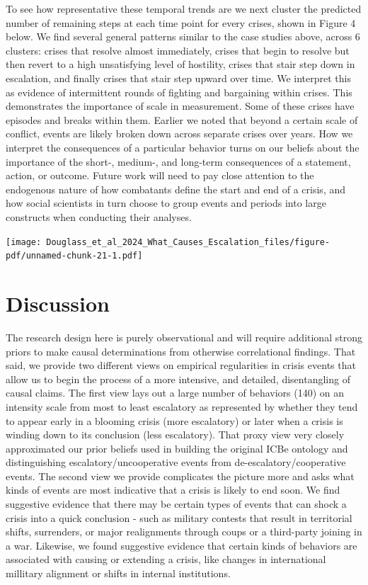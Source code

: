 \documentclass[
]{article}
\begin{document}
To see how representative these temporal trends are we next cluster the
predicted number of remaining steps at each time point for every crises,
shown in Figure 4 below. We find several general patterns similar to the
case studies above, across 6 clusters: crises that resolve almost
immediately, crises that begin to resolve but then revert to a high
unsatisfying level of hostility, crises that stair step down in
escalation, and finally crises that stair step upward over time. We
interpret this as evidence of intermittent rounds of fighting and
bargaining within crises. This demonstrates the importance of scale in
measurement. Some of these crises have episodes and breaks within them.
Earlier we noted that beyond a certain scale of conflict, events are
likely broken down across separate crises over years. How we interpret
the consequences of a particular behavior turns on our beliefs about the
importance of the short-, medium-, and long-term consequences of a
statement, action, or outcome. Future work will need to pay close
attention to the endogenous nature of how combatants define the start
and end of a crisis, and how social scientists in turn choose to group
events and periods into large constructs when conducting their analyses.

\texttt{[image: Douglass\_et\_al\_2024\_What\_Causes\_Escalation\_files/figure-pdf/unnamed-chunk-21-1.pdf]}

\section{Discussion}\label{discussion}

The research design here is purely observational and will require
additional strong priors to make causal determinations from otherwise
correlational findings. That said, we provide two different views on
empirical regularities in crisis events that allow us to begin the
process of a more intensive, and detailed, disentangling of causal
claims. The first view lays out a large number of behaviors (140) on an
intensity scale from most to least escalatory as represented by whether
they tend to appear early in a blooming crisis (more escalatory) or
later when a crisis is winding down to its conclusion (less escalatory).
That proxy view very closely approximated our prior beliefs used in
building the original ICBe ontology and distinguishing
escalatory/uncooperative events from de-escalatory/cooperative events.
The second view we provide complicates the picture more and asks what
kinds of events are most indicative that a crisis is likely to end soon.
We find suggestive evidence that there may be certain types of events
that can shock a crisis into a quick conclusion - such as military
contests that result in territorial shifts, surrenders, or major
realignments through coups or a third-party joining in a war. Likewise,
we found suggestive evidence that certain kinds of behaviors are
associated with causing or extending a crisis, like changes in
international millitary alignment or shifts in internal institutions.
\end{document}
